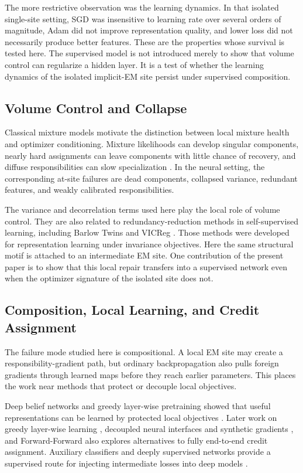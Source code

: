The more restrictive observation was the learning dynamics. In that isolated
single-site setting, SGD was insensitive to learning rate over several orders
of magnitude, Adam did not improve representation quality, and lower loss did
not necessarily produce better features. These are the properties whose
survival is tested here. The supervised model is not introduced merely to
show that volume control can regularize a hidden layer. It is a test of
whether the learning dynamics of the isolated implicit-EM site persist under
supervised composition.

\subsection{Volume Control and Collapse}
Classical mixture models motivate the distinction between local mixture
health and optimizer conditioning. Mixture likelihoods can develop singular
components, nearly hard assignments can leave components with little chance
of recovery, and diffuse responsibilities can slow specialization
\citep{redner1984mixture,mclachlan2000finite}. In the neural setting, the
corresponding at-site failures are dead components, collapsed variance,
redundant features, and weakly calibrated responsibilities.

The variance and decorrelation terms used here play the local role of volume
control. They are also related to redundancy-reduction methods in
self-supervised learning, including Barlow Twins and VICReg
\citep{zbontar2021barlow,bardes2022vicreg}. Those methods were developed for
representation learning under invariance objectives. Here the same structural
motif is attached to an intermediate EM site. One contribution of the present
paper is to show that this local repair transfers into a supervised network
even when the optimizer signature of the isolated site does not.

\subsection{Composition, Local Learning, and Credit Assignment}
The failure mode studied here is compositional. A local EM site may create a
responsibility-gradient path, but ordinary backpropagation also pulls foreign
gradients through learned maps before they reach earlier parameters. This
places the work near methods that protect or decouple local objectives.

Deep belief networks and greedy layer-wise pretraining showed that useful
representations can be learned by protected local objectives
\citep{hinton2006fast}. Later work on greedy layer-wise learning
\citep{belilovsky2019greedy}, decoupled neural interfaces and synthetic
gradients \citep{jaderberg2017decoupled}, and Forward-Forward
\citep{hinton2022forward} also explores alternatives to fully end-to-end
credit assignment. Auxiliary classifiers and deeply supervised networks
provide a supervised route for injecting intermediate losses into deep models
\citep{szegedy2015going,lee2015deeply}.

